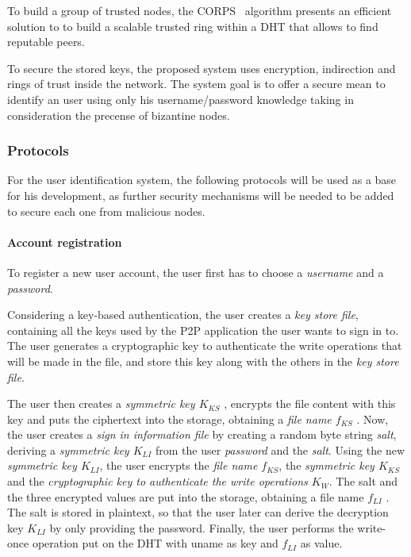 \documentclass[12pt,spanish]{article}
\begin{document}
To build a group of trusted nodes, the CORPS~\cite{rosas2011corps} algorithm
presents an efficient solution to to build a scalable
trusted ring within a DHT that allows to find reputable
peers.


To secure the stored keys, the proposed system uses encryption, indirection and
rings of trust inside the network. The system goal is to offer a secure mean to
identify an user using only his username/password knowledge taking in
consideration the precense of bizantine nodes.

\subsubsection{Protocols}
For the user identification system, the following protocols will be used as a
base for his development, as further security mechanisms will be needed to be
added to secure each one from malicious nodes.

\paragraph{Account registration}

To register a new user account, the user first
has to choose a \textit{username} and a \textit{password}.

Considering a key-based authentication, the user creates a \textit{key store file}, containing all the
keys used by the P2P application the user wants to sign in to.
The user generates a cryptographic key to authenticate the write operations
that will be made in the file, and store this key along with the others in the
\textit{key store file}.


The user then creates a \textit{symmetric key $K_{KS}$} ,
encrypts the file content with this key and puts the ciphertext
into the storage, obtaining a \textit{file name $f_{KS}$} . Now, the user
creates a \textit{sign in information file} by creating a random
byte string \textit{salt}, deriving a \textit{symmetric key $K_{LI}$} from the user
\textit{password} and the \textit{salt}.
Using the new \textit{ symmetric key $K_{LI}$}, the user encrypts the
\textit{file name $f_{KS}$},
the \textit{symmetric key $K_{KS}$} and the \textit{cryptographic key to
authenticate the write operations $K_W$}.
 The salt and the three encrypted values are put
into the storage, obtaining a file name $f_{LI}$ . The salt is stored
in plaintext, so that the user later can derive the decryption
key $K_{LI}$ by only providing the password. Finally, the user
performs the write-once operation put on the DHT with
uname as key and $f_{LI}$ as value.
\end{document}
